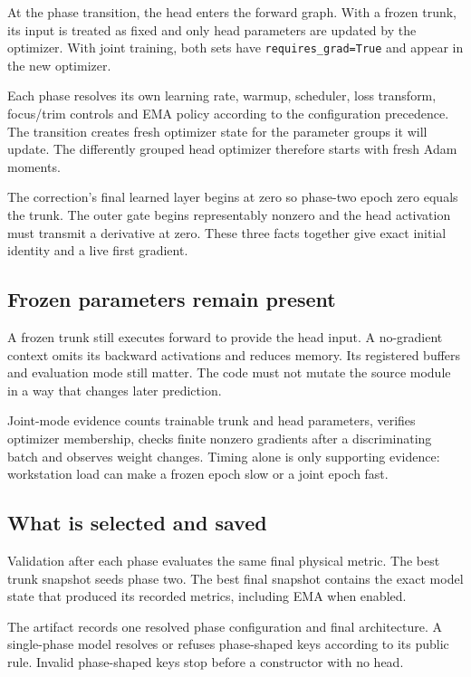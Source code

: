 \documentclass[10pt,aps,prd,twocolumn,nofootinbib]{revtex4-2}
\newcommand{\code}[1]{\texttt{#1}}
\begin{document}
At the phase transition, the head enters the forward graph.  With a frozen
trunk, its input is treated as fixed and only head parameters are updated by
the optimizer.
With joint training, both sets have \code{requires\_grad=True} and appear in
the new optimizer.

Each phase resolves its own learning rate, warmup, scheduler, loss transform,
focus/trim controls and EMA policy according to the configuration
precedence.  The transition creates fresh optimizer state for the parameter
groups it will update.  The differently grouped head optimizer therefore
starts with fresh Adam moments.

The correction's final learned layer begins at zero so phase-two epoch zero
equals the trunk.  The outer gate begins representably nonzero and the
head activation must transmit a derivative at zero.  These three facts
together give exact initial identity and a live first gradient.

\subsection{Frozen parameters remain present}

A frozen trunk still executes forward to provide the head input.  A
no-gradient context omits its backward activations and reduces memory.  Its registered buffers and
evaluation mode still matter.  The code must not mutate the source module in
a way that changes later prediction.

Joint-mode evidence counts trainable trunk and head parameters, verifies
optimizer membership, checks finite nonzero gradients after a discriminating
batch and observes weight changes.  Timing alone is only supporting evidence:
workstation load can make a frozen epoch slow or a joint epoch fast.

\subsection{What is selected and saved}

Validation after each phase evaluates the same final physical metric.  The
best trunk snapshot seeds phase two.  The best final snapshot contains the
exact model state that produced its recorded metrics, including EMA when
enabled.

The artifact records one resolved phase configuration and final architecture.
A single-phase model resolves or
refuses phase-shaped keys according to its public rule.  Invalid phase-shaped
keys stop before a constructor with no head.
\end{document}
